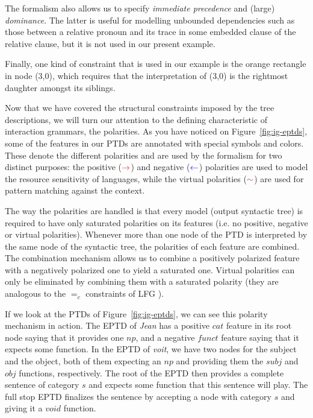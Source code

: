 The formalism also allows us to specify \emph{immediate precedence} and
(large) \emph{dominance}. The latter is useful for modelling unbounded
dependencies such as those between a relative pronoun and its trace in
some embedded clause of the relative clause, but it is not used in our
present example.

Finally, one kind of constraint that is used in our example is the
orange rectangle in node (3,0), which requires that the interpretation
of (3,0) is the rightmost daughter amongst its siblings.

Now that we have covered the structural constraints imposed by the tree
descriptions, we will turn our attention to the defining characteristic
of interaction grammars, the polarities. As you have noticed on
Figure~\ref{fig:ig-eptds}, some of the features in our PTDs are
annotated with special symbols and colors. These denote the different
polarities and are used by the formalism for two distinct purposes: the
positive ($\textcolor{red}{\rightarrow}$) and negative
($\textcolor{blue}{\leftarrow}$) polarities are used to model the
resource sensitivity of languages, while the virtual polarities
($\textcolor{purple}{\sim}$) are used for pattern matching against the
context.

The way the polarities are handled is that every model (output syntactic
tree) is required to have only saturated polarities on its features
(i.e. no positive, negative or virtual polarities). Whenever more than
one node of the PTD is interpreted by the same node of the syntactic
tree, the polarities of each feature are combined. The combination
mechanism allows us to combine a positively polarized feature with a
negatively polarized one to yield a saturated one. Virtual polarities
can only be eliminated by combining them with a saturated polarity (they
are analogous to the $=_{c}$ constraints of LFG
\cite{kaplan1982lexical}).

If we look at the PTDs of Figure~\ref{fig:ig-eptds}, we can see this
polarity mechanism in action. The EPTD of \emph{Jean} has a positive
$cat$ feature in its root node saying that it provides one $np$, and a
negative $funct$ feature saying that it expects some function. In the
EPTD of \emph{voit}, we have two nodes for the subject and the object,
both of them expecting an $np$ and providing them the $subj$ and $obj$
functions, respectively. The root of the EPTD then provides a complete
sentence of category $s$ and expects some function that this sentence
will play. The full stop EPTD finalizes the sentence by accepting a node
with category $s$ and giving it a $void$ function.

